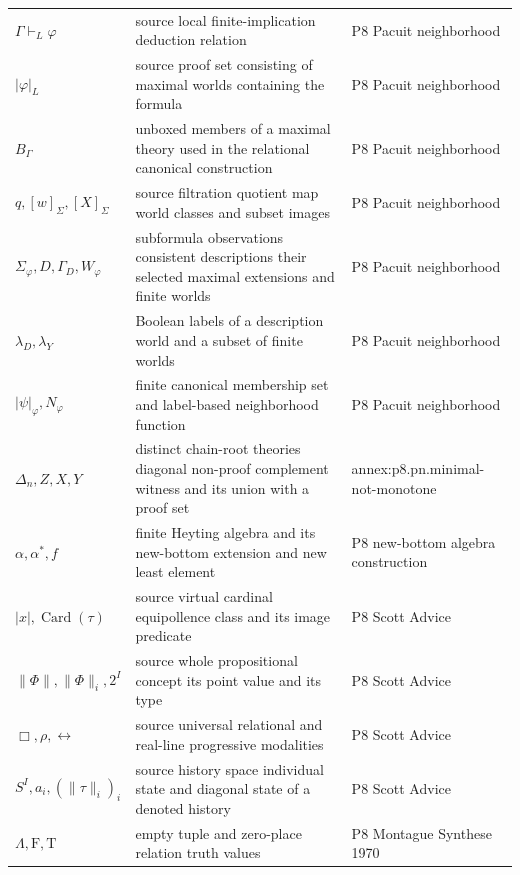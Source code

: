 \begin{longtable}{@{}p{}p{}p{}@{}}
\(\Gamma\vdash_L\varphi\) & source local finite-implication deduction relation & P8 Pacuit neighborhood \\
\(|\varphi|_L\) & source proof set consisting of maximal worlds containing the formula & P8 Pacuit neighborhood \\
\(B_\Gamma\) & unboxed members of a maximal theory used in the relational canonical construction & P8 Pacuit neighborhood \\
\(q,\allowbreak [w]_\Sigma,\allowbreak [X]_\Sigma\) & source filtration quotient map world classes and subset images & P8 Pacuit neighborhood \\
\(\Sigma_\varphi,\allowbreak D,\allowbreak \Gamma_D,\allowbreak W_\varphi\) & subformula observations consistent descriptions their selected maximal extensions and finite worlds & P8 Pacuit neighborhood \\
\(\lambda_D,\allowbreak \lambda_Y\) & Boolean labels of a description world and a subset of finite worlds & P8 Pacuit neighborhood \\
\(|\psi|_\varphi,\allowbreak N_\varphi\) & finite canonical membership set and label-based neighborhood function & P8 Pacuit neighborhood \\
\(\Delta_n,\allowbreak Z,\allowbreak X,\allowbreak Y\) & distinct chain-root theories diagonal non-proof complement witness and its union with a proof set & annex:\allowbreak{}p8.\allowbreak{}pn.\allowbreak{}minimal-\allowbreak{}not-\allowbreak{}monotone \\
\(\alpha,\allowbreak \alpha^*,\allowbreak f\) & finite Heyting algebra and its new-bottom extension and new least element & P8 new-\allowbreak{}bottom algebra construction \\
\(|x|,\allowbreak \operatorname{Card}(\tau)\) & source virtual cardinal equipollence class and its image predicate & P8 Scott Advice \\
\(\|\Phi\|,\allowbreak \|\Phi\|_i,\allowbreak 2^I\) & source whole propositional concept its point value and its type & P8 Scott Advice \\
\(\Box,\allowbreak \boxed\rho,\allowbreak \boxed{\leftrightarrow}\) & source universal relational and real-line progressive modalities & P8 Scott Advice \\
\(S^I,\allowbreak a_i,\allowbreak (\|\tau\|_i)_i\) & source history space individual state and diagonal state of a denoted history & P8 Scott Advice \\
\(\Lambda,\allowbreak \mathrm F,\allowbreak \mathrm T\) & empty tuple and zero-place relation truth values & P8 Montague Synthese 1970 \\

\end{longtable}

